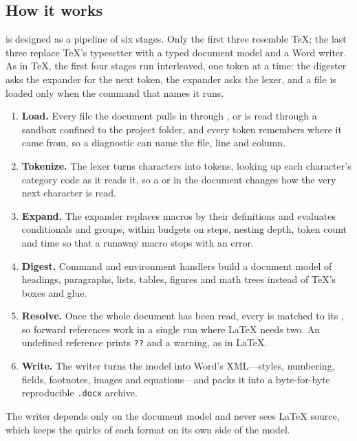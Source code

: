 \subsection{How it works}

\texdocx{} is designed as a pipeline of six stages. Only the first three
resemble \TeX; the last three replace \TeX's typesetter with a typed document
model and a Word writer. As in \TeX, the first four stages run interleaved,
one token at a time: the digester asks the expander for the next token, the
expander asks the lexer, and a file is loaded only when the command that
names it runs.
\begin{enumerate}
  \item \textbf{Load.} Every file the document pulls in through
        ,  or  is read through
        a sandbox confined to the project folder, and every token remembers
        where it came from, so a diagnostic can name the file, line and column.
  \item \textbf{Tokenize.} The lexer turns characters into tokens, looking
        up each character's category code as it reads it, so a
         or  in the document changes how the
        very next character is read.
  \item \textbf{Expand.} The expander replaces macros by their definitions and
        evaluates conditionals and groups, within budgets on steps, nesting
        depth, token count and time so that a runaway macro stops with an error.
  \item \textbf{Digest.} Command and environment handlers build a document
        model of headings, paragraphs, lists, tables, figures and math trees
        instead of \TeX's boxes and glue.
  \item \textbf{Resolve.} Once the whole document has been read, every
         is matched to its , so forward references work
        in a single run where \LaTeX{} needs two. An undefined reference
        prints \texttt{??} and a warning, as in \LaTeX.
  \item \textbf{Write.} The writer turns the model into Word's XML---styles,
        numbering, fields, footnotes, images and equations---and packs it into
        a byte-for-byte reproducible \texttt{.docx} archive.
\end{enumerate}
The writer depends only on the document model and never sees \LaTeX{} source,
which keeps the quirks of each format on its own side of the model.
